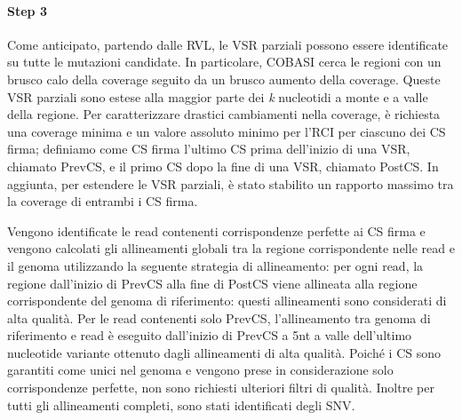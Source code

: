 \documentclass[../main.tex]{subfiles}
\begin{document}
\paragraph{Step 3} Come anticipato, partendo dalle RVL, le VSR parziali possono essere identificate su tutte le mutazioni candidate. In particolare, COBASI cerca le regioni con un brusco calo della coverage seguito da un brusco aumento della coverage. Queste VSR parziali sono estese alla maggior parte dei \textit{k} nucleotidi a monte e a valle della regione. Per caratterizzare drastici cambiamenti nella coverage, è richiesta una coverage minima e un valore assoluto minimo per l'RCI per ciascuno dei CS firma; definiamo come CS firma l'ultimo CS prima dell'inizio di una VSR, chiamato PrevCS, e il primo CS dopo la fine di una VSR, chiamato  PostCS. In aggiunta, per estendere le VSR parziali, è stato stabilito un rapporto massimo tra la coverage di entrambi i CS firma. 

Vengono identificate le read contenenti corrispondenze perfette ai CS firma e vengono calcolati gli allineamenti globali tra la regione corrispondente nelle read e il genoma utilizzando la seguente strategia di allineamento: per ogni read, la regione dall'inizio di PrevCS alla fine di PostCS viene allineata alla regione corrispondente del genoma di riferimento: questi allineamenti sono considerati di alta qualità. Per le read contenenti solo PrevCS, l'allineamento tra genoma di riferimento e read è eseguito dall'inizio di PrevCS a 5nt a valle dell'ultimo nucleotide variante ottenuto dagli allineamenti di alta qualità. Poiché i CS sono garantiti come unici nel genoma e vengono prese in considerazione solo corrispondenze perfette, non sono richiesti ulteriori filtri di qualità. Inoltre per tutti gli allineamenti completi, sono stati identificati degli SNV.
\end{document}
